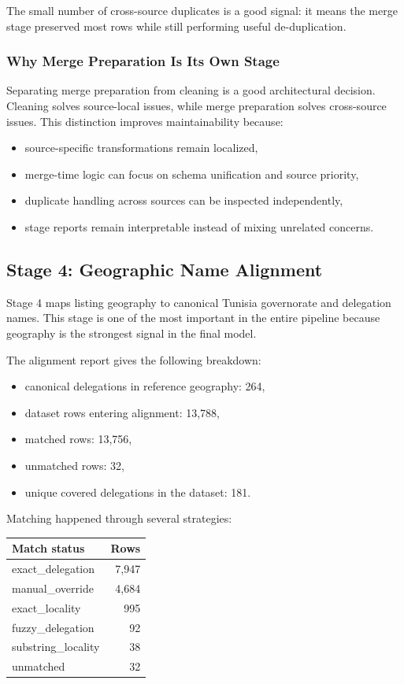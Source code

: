 \documentclass[11pt,a4paper]{article}
\begin{document}
The small number of cross-source duplicates is a good signal: it means the merge stage preserved most rows while still performing useful de-duplication.

\subsubsection{Why Merge Preparation Is Its Own Stage}

Separating merge preparation from cleaning is a good architectural decision. Cleaning solves source-local issues, while merge preparation solves cross-source issues. This distinction improves maintainability because:

\begin{itemize}
\item source-specific transformations remain localized,
\item merge-time logic can focus on schema unification and source priority,
\item duplicate handling across sources can be inspected independently,
\item stage reports remain interpretable instead of mixing unrelated concerns.
\end{itemize}

\subsection{Stage 4: Geographic Name Alignment}

Stage 4 maps listing geography to canonical Tunisia governorate and delegation names. This stage is one of the most important in the entire pipeline because geography is the strongest signal in the final model.

The alignment report gives the following breakdown:

\begin{itemize}
\item canonical delegations in reference geography: 264,
\item dataset rows entering alignment: 13,788,
\item matched rows: 13,756,
\item unmatched rows: 32,
\item unique covered delegations in the dataset: 181.
\end{itemize}

Matching happened through several strategies:

\begin{center}
\begin{tabular}{lr}
\toprule
Match status & Rows \\
\midrule
exact\_delegation & 7,947 \\
manual\_override & 4,684 \\
exact\_locality & 995 \\
fuzzy\_delegation & 92 \\
substring\_locality & 38 \\
unmatched & 32 \\
\bottomrule
\end{tabular}
\end{center}
\end{document}
